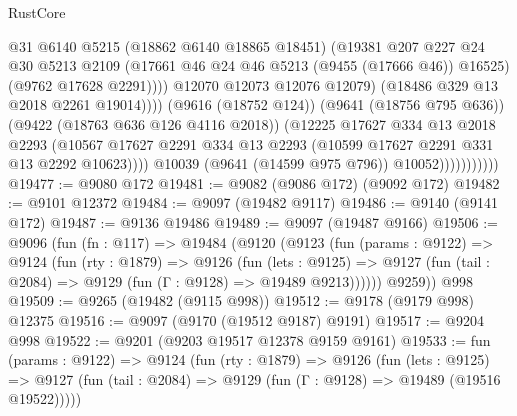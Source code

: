 \begin{lexlean}{RustCore}
\begin{coremodule}
                                        @31
                                        @6140
                                        @5215
                                        (@18862 @6140 @18865 @18451)
                                        (@19381
                                          @207
                                          @227
                                          @24
                                          @30
                                          @5213
                                          @2109
                                          (@17661 @46 @24 @46 @5213 (@9455 (@17666 @46)) @16525)
                                          (@9762 @17628 @2291))))
                                    @12070
                                    @12073
                                    @12076
                                    @12079)
                                  (@18486 @329 @13 @2018 @2261 @19014))))
                            (@9616 (@18752 @124))
                            (@9641 (@18756 @795 @636))
                            (@9422 (@18763 @636 @126 @4116 @2018))
                            (@12225
                              @17627
                              @334
                              @13
                              @2018
                              @2293
                              (@10567
                                @17627
                                @2291
                                @334
                                @13
                                @2293
                                (@10599 @17627 @2291 @331 @13 @2292 @10623))))
                          @10039
                          (@9641 (@14599 @975 @796))
                          @10052)))))))))))
@19477 := @9080 @172
@19481 := @9082 (@9086 @172) (@9092 @172)
@19482 := @9101 @12372
@19484 := @9097 (@19482 @9117)
@19486 := @9140 (@9141 @172)
@19487 := @9136 @19486
@19489 := @9097 (@19487 @9166)
@19506 := @9096
    (fun (fn : @117) =>
    @19484
      (@9120
        (@9123
          (fun (params : @9122) =>
          @9124
            (fun (rty : @1879) =>
            @9126
              (fun (lets : @9125) =>
              @9127 (fun (tail : @2084) => @9129 (fun (Γ : @9128) => @19489 @9213))))))
        @9259))
    @998
@19509 := @9265 (@19482 (@9115 @998))
@19512 := @9178 (@9179 @998) @12375
@19516 := @9097 (@9170 (@19512 @9187) @9191)
@19517 := @9204 @998
@19522 := @9201 (@9203 @19517 @12378 @9159 @9161)
@19533 := fun (params : @9122) =>
  @9124
    (fun (rty : @1879) =>
    @9126
      (fun (lets : @9125) =>
      @9127 (fun (tail : @2084) => @9129 (fun (Γ : @9128) => @19489 (@19516 @19522)))))

\end{coremodule}
\end{lexlean}
